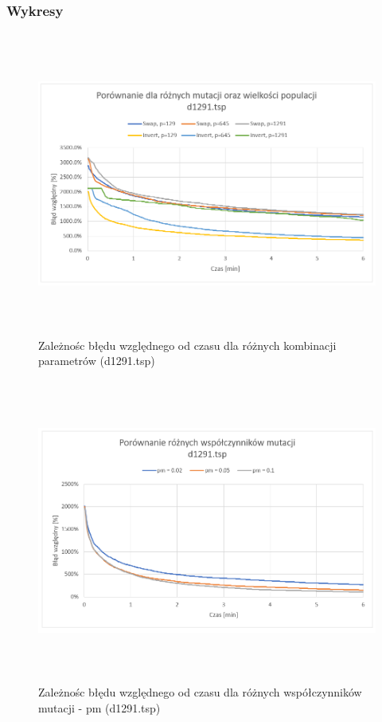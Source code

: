 \documentclass[a4paper,11pt]{article}
\begin{document}
\subsubsection{Wykresy}

\begin{figure}[H]
\centering
\includegraphics[height=10cm]{w3.PNG}
\caption{Zależnośc błędu względnego od czasu dla różnych kombinacji parametrów (d1291.tsp)}
\end{figure}

\begin{figure}[H]
\centering
\includegraphics[height=10cm]{w6.PNG}
\caption{Zależnośc błędu względnego od czasu dla różnych współczynników mutacji - pm (d1291.tsp)}
\end{figure}
\end{document}
